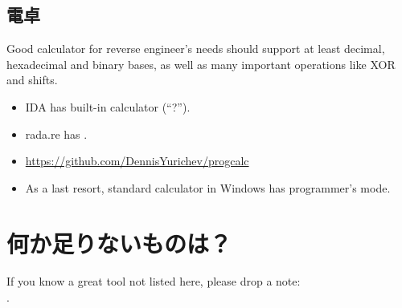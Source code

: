 \subsection{電卓}

Good calculator for reverse engineer's needs should support at least decimal, hexadecimal and binary bases,
as well as many important operations like XOR and shifts.

\begin{itemize}

\item IDA has built-in calculator (``?'').

\item rada.re has .

\item \url{https://github.com/DennisYurichev/progcalc}

\item As a last resort, standard calculator in Windows has programmer's mode.

\end{itemize}

\section{何か足りないものは？}

If you know a great tool not listed here, please drop a note:\\
\TT{\EMAIL}.

